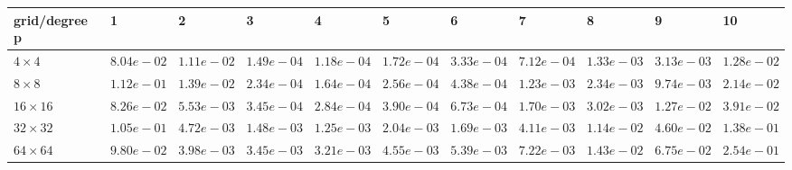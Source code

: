 \begin{tabular}{lllllllllll}
\hline
 grid/degree p   & 1          & 2          & 3          & 4          & 5          & 6          & 7          & 8          & 9          & 10         \\
\hline
 $4 \times 4$    & $8.04e-02$ & $1.11e-02$ & $1.49e-04$ & $1.18e-04$ & $1.72e-04$ & $3.33e-04$ & $7.12e-04$ & $1.33e-03$ & $3.13e-03$ & $1.28e-02$ \\
 $8 \times 8$    & $1.12e-01$ & $1.39e-02$ & $2.34e-04$ & $1.64e-04$ & $2.56e-04$ & $4.38e-04$ & $1.23e-03$ & $2.34e-03$ & $9.74e-03$ & $2.14e-02$ \\
 $16 \times 16$  & $8.26e-02$ & $5.53e-03$ & $3.45e-04$ & $2.84e-04$ & $3.90e-04$ & $6.73e-04$ & $1.70e-03$ & $3.02e-03$ & $1.27e-02$ & $3.91e-02$ \\
 $32 \times 32$  & $1.05e-01$ & $4.72e-03$ & $1.48e-03$ & $1.25e-03$ & $2.04e-03$ & $1.69e-03$ & $4.11e-03$ & $1.14e-02$ & $4.60e-02$ & $1.38e-01$ \\
 $64 \times 64$  & $9.80e-02$ & $3.98e-03$ & $3.45e-03$ & $3.21e-03$ & $4.55e-03$ & $5.39e-03$ & $7.22e-03$ & $1.43e-02$ & $6.75e-02$ & $2.54e-01$ \\
\hline
\end{tabular}